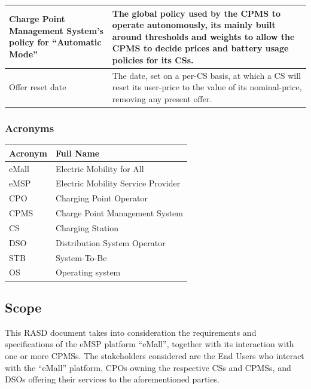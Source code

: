 \documentclass[11pt]{article}
\begin{document}
\begin{table}[H]
\begin{tabularx}{\textwidth}{|>{\centering\hsize=0.4\hsize}X|>{\hsize=1.6\hsize}X|}
        \hline
        Charge Point Management System's policy for “Automatic Mode” & The global policy used by the CPMS to operate autonomously, its mainly built around thresholds and weights to allow the CPMS to decide prices and battery usage policies for its CSs. \\
        \hline
        Offer reset date & The date, set on a per-CS basis, at which a CS will reset its user-price to the value of its nominal-price, removing any present offer. \\
        \hline
    \end{tabularx}
    \label{tab:definitions}
\end{table}

\subsubsection{Acronyms}

\begin{table}[H]
    \centering
    \setlength{\tabcolsep}{18pt}
    \renewcommand{\arraystretch}{1.2}
    \begin{tabularx}{\textwidth}{|>{\centering\hsize=0.3\hsize}X|>{\hsize=1.7\hsize}X|}
        \hline
        \textbf{Acronym} & \textbf{Full Name} \\
        \hline
        eMall & Electric Mobility for All \\
        \hline
        eMSP & Electric Mobility Service Provider \\
        \hline
        CPO & Charging Point Operator \\
        \hline
        CPMS & Charge Point Management System \\
        \hline
        CS & Charging Station \\
        \hline
        DSO & Distribution System Operator \\
        \hline
        STB & System-To-Be \\
        \hline
        OS & Operating system \\
        \hline
    \end{tabularx}
    \label{tab:acronyms}
\end{table}

\subsection{Scope}

This RASD document takes into consideration the requirements and specifications of the eMSP platform “eMall”, together with its interaction with one or more CPMSs. The stakeholders considered are the End Users who interact with the “eMall” platform, CPOs owning the respective CSs and CPMSs, and DSOs offering their services to the aforementioned parties.
\end{document}
